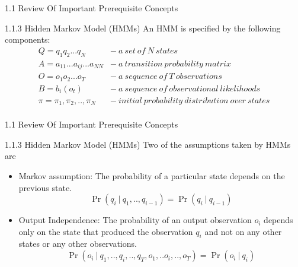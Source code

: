 \documentclass{beamer}
\providecommand{\pr}[1]{\ensuremath{\Pr\left(#1\right)}}
\begin{document}
\begin{frame}{1.1 Review Of Important Prerequisite Concepts}
\begin{block}{1.1.3 Hidden Markov Model (HMMs)}
An HMM is specified by the following components:
\begin{equation}
    \begin{split}
    Q = q_1q_2...q_N                &-\ a\ set\ of\ N\ states\\
    A = a_{11}...a_{ij}...a_{NN}    &-\ a\ transition\ probability\ matrix\\
    O = o_1o_2...o_T                &-\ a\ sequence\ of\ T\ observations\\
    B = b_i(o_t)                    &-\ a\ sequence\ of\ observational\ likelihoods\\
    \pi = \pi_1,\pi_2,..,\pi_N      &-\ initial\ probability\ distribution\ over\ states\\
    \end{split}
\end{equation}
\end{block}
\end{frame}
\begin{frame}{1.1 Review Of Important Prerequisite Concepts}
\begin{block}{1.1.3 Hidden Markov Model (HMMs)}
Two of the assumptions taken by HMMs are 
\begin{itemize}
    \item  Markov assumption: The probability of a particular state depends on the previous state.\\
    \begin{equation}
       \pr{q_i\ |\ q_1,..,q_{i-1}} = \pr{q_i\ |\ q_{i-1}}
    \end{equation}
    \item Output Independence: The probability of an output observation $o_i$ depends only on the state that produced the observation $q_i$ and not on any other states or any other observations.\\
    \begin{equation}
        \pr{o_i\ |\ q_1,..,q_i,..,q_T,o_1,..o_i,..,o_T} = \pr{o_i\ |\ q_i}
    \end{equation}
\end{itemize}
\end{block}
\end{frame}
\end{document}

